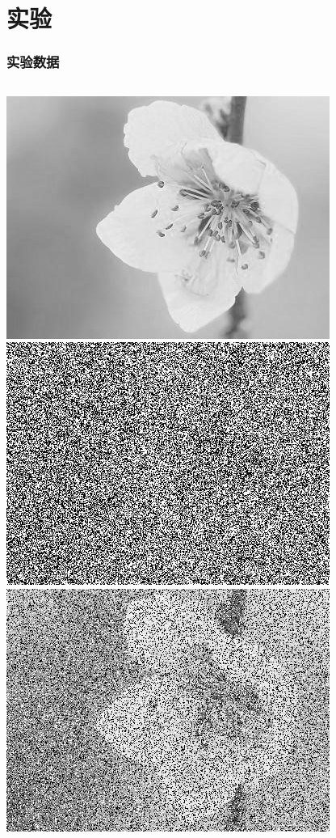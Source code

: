 \documentclass[10pt,aspectratio=43,mathserif]{beamer}
\begin{document}
\section[实验]{实验}
\begin{frame}
\frametitle{\textbf{实验数据}}
\begin{columns}
	
\includegraphics[scale=0.2]{exp-0.jpg}
\includegraphics[scale=0.2]{exp-4.jpg}
\includegraphics[scale=0.2]{exp-8.jpg}


\end{columns}
\end{frame}
\end{document}
